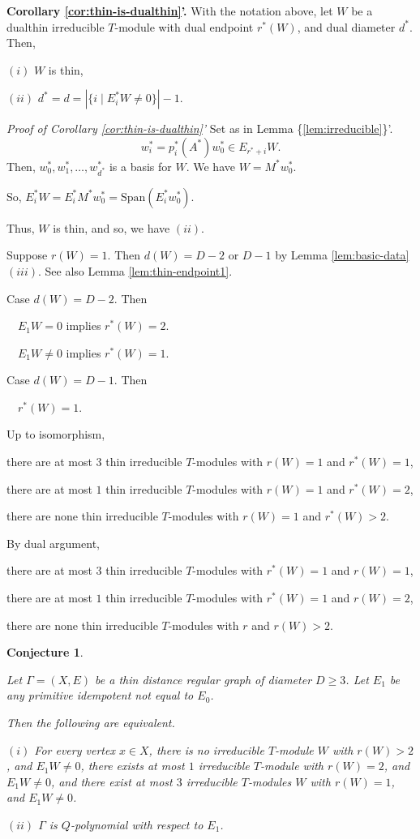 \documentclass[
]{book}
\newtheorem{conjecture}{Conjecture}[chapter]
\theoremstyle{definition}
\theoremstyle{definition}
\theoremstyle{definition}
\theoremstyle{definition}
\theoremstyle{remark}
\begin{document}
\textbf{Corollary \ref{cor:thin-is-dualthin}'.}
With the notation above, let \(W\) be a dualthin irreducible \(T\)-module with dual endpoint \(r^*(W)\), and dual diameter \(d^*\). Then,

\((i)\) \(W\) is thin,

\((ii)\) \(d^* = d = |\{i\mid E^*_iW\neq 0\}| -1\).

\emph{Proof of Corollary \ref{cor:thin-is-dualthin}'}
Set as in Lemma \{\ref{lem:irreducible}\}'.
\[w^*_i = p^*_i(A^*)w^*_0 \in E_{r^*+i}W.\]
Then, \(w^*_0, w^*_1, \ldots, w^*_{d^*}\) is a basis for \(W\). We have \(W = M^*w^*_0\).

So, \(E^*_iW = E^*_iM^*w^*_0 = \mathrm{Span}(E^*_iw^*_0)\).

Thus, \(W\) is thin, and so, we have \((ii)\).

\hfill\break

Suppose \(r(W) = 1\). Then \(d(W) = D-2\) or \(D-1\) by Lemma \ref{lem:basic-data} \((iii)\). See also Lemma \ref{lem:thin-endpoint1}.

Case \(d(W) = D-2\). Then

\(\quad E_1W = 0\) implies \(r^*(W) = 2\).

\(\quad E_1W\neq 0\) implies \(r^*(W) = 1\).

Case \(d(W) = D-1\). Then

\(\quad r^*(W) = 1\).

Up to isomorphism,

there are at most \(3\) thin irreducible \(T\)-modules with \(r(W) =1\) and \(r^*(W)=1\),

there are at most \(1\) thin irreducible \(T\)-modules with \(r(W) = 1\) and \(r^*(W)=2\),

there are none thin irreducible \(T\)-modules with \(r(W) = 1\) and \(r^*(W) > 2\).

By dual argument,

there are at most \(3\) thin irreducible \(T\)-modules with \(r^*(W) =1\) and \(r(W)=1\),

there are at most \(1\) thin irreducible \(T\)-modules with \(r^*(W) = 1\) and \(r(W)=2\),

there are none thin irreducible \(T\)-modules with \(r%
\) and \(r(W) > 2\).

\begin{conjecture}
\protect\hypertarget{cnj:q-polynomial}{}\label{cnj:q-polynomial}

Let \(\Gamma = (X, E)\) be a thin distance regular graph of diameter \(D\geq 3\). Let \(E_1\) be any primitive idempotent not equal to \(E_0\).

Then the following are equivalent.

\((i)\) For every vertex \(x\in X\), there is no irreducible \(T\)-module \(W\) with \(r(W)>2\), and \(E_1W\neq 0\), there exists at most \(1\) irreducible \(T\)-module with \(r(W) =2\), and \(E_1W \neq 0\), and there exist at most \(3\) irreducible \(T\)-modules \(W\) with \(r(W)=1\), and \(E_1W\neq 0\).

\((ii)\) \(\Gamma\) is \(Q\)-polynomial with respect to \(E_1\).

\end{conjecture}
\end{document}
